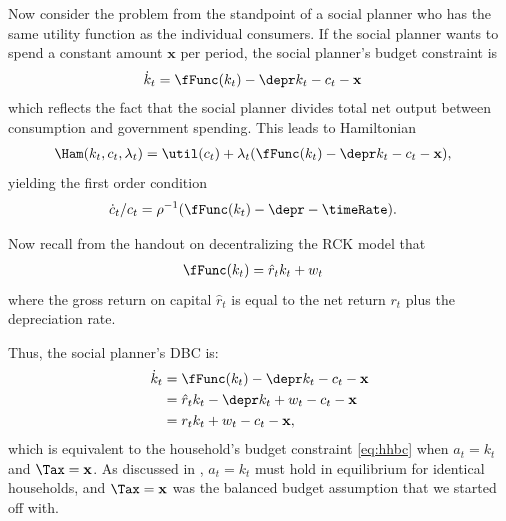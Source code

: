 \documentclass{handout}\usepackage{handoutSetup}\usepackage{handoutShortcuts}
\begin{document}
Now consider the problem from the standpoint of a social planner who has the same utility function as the 
individual consumers.  If the social planner wants to spend a constant
amount $\mathbf{x}$ per period, the social planner's budget constraint is
\begin{equation}\begin{gathered}\begin{aligned}
        \dot{k}_{t} & =  \fFunc(k_{t}) - \depr k_{t} - c_{t} - \mathbf{x}
\end{aligned}\end{gathered}\end{equation}
which reflects the fact that the social planner divides total net output
between consumption and government spending.  This leads to Hamiltonian
\begin{equation}\begin{gathered}\begin{aligned}
        \Ham(k_{t},c_{t},\lambda_{t})  & =  \util(c_{t}) + \lambda_{t}(\fFunc(k_{t}) - \depr k_{t} - c_{t} - \mathbf{x}),
\end{aligned}\end{gathered}\end{equation}
yielding the first order condition 
\begin{equation}\begin{gathered}\begin{aligned}
        \dot{c}_{t}/c_{t} & =  \rho^{-1}(\fFunc(k_{t})-\depr-\timeRate).
\end{aligned}\end{gathered}\end{equation}

Now recall from the handout on decentralizing the RCK model
that
\begin{equation}\begin{gathered}\begin{aligned}
        \fFunc(k_{t}) & =  \hat{r}_t k_{t} + w_{t}
\end{aligned}\end{gathered}\end{equation}
where the gross return on capital $\hat{r}_t$ is equal to the net
return $r_t$ plus the depreciation rate.  

Thus, the social planner's DBC is:
\begin{equation}\begin{gathered}\begin{aligned}
        \dot{k}_{t} & =  \fFunc(k_{t})-\depr k_{t} - c_{t} - \mathbf{x}
\\          & =  \hat{r}_{t} k_{t}     - \depr k_{t} + w_t - c_t - \mathbf{x}
\\          & =  r_{t} k_{t} + w_{t} - c_{t} - \mathbf{x},
\end{aligned}\end{gathered}\end{equation}
which is equivalent to the household's budget constraint 
\eqref{eq:hhbc} when $a_{t}=k_{t}$ and $\Tax=\mathbf{x}$.  As discussed 
in , $a_t=k_{t}$ must hold in equilibrium for identical households, 
and $\Tax = \mathbf{x}$ was the balanced budget assumption that we started 
off with.
\end{document}
